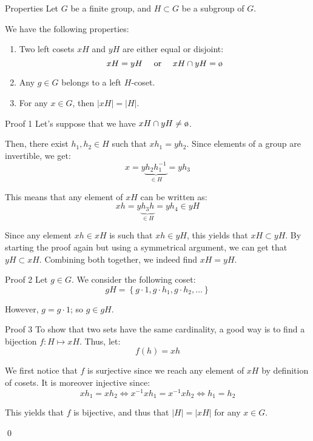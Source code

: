 \documentclass[a4paper]{article}
\begin{document}
\begin{parag}{Properties}
    Let $G$ be a finite group, and $H \subset G$ be a subgroup of $G$.

    We have the following properties:
    \begin{enumerate}
        \item Two left cosets $xH$ and $yH$ are either equal or disjoint: 
        \[x H = y H \mathspace \text{ or } \mathspace xH \cap y H = \o\]
        \item Any $g \in G$ belongs to a left $H$-coset.
        \item For any $x \in G$, then $\left|x H\right| = \left|H\right|$.
    \end{enumerate}
    
    \begin{subparag}{Proof 1}
        Let's suppose that we have $x H \cap y H \neq \o$.

        Then, there exist $h_1, h_2 \in H$ such that $x h_1 = y h_2$. Since elements of a group are invertible, we get: 
        \[x = y \underbrace{h_2 h_1^{-1}}_{\in H} = y h_3\]
        
        This means that any element of $xH$ can be written as: 
        \[xh = y \underbrace{h_3 h}_{\in H} = y h_4 \in y H\]

        Since any element $xh \in xH$ is such that $xh \in yH$, this yields that $x H \subset y H$. By starting the proof again but using a symmetrical argument, we can get that $yH \subset x H$. Combining both together, we indeed find $x H = yH$.
    \end{subparag}
    
    \begin{subparag}{Proof 2}
        Let $g \in G$. We consider the following coset: 
        \[gH = \left\{g\cdot 1, g\cdot h_1, g\cdot h_2, \ldots\right\}\]
        
        However, $g = g\cdot 1$; so $g \in gH$.
    \end{subparag}
    
    \begin{subparag}{Proof 3}
        To show that two sets have the same cardinality, a good way is to find a bijection $f: H \mapsto xH$. Thus, let: 
        \[f\left(h\right) = xh\]
        
        We first notice that $f$ is surjective since we reach any element of $xH$ by definition of cosets. It is moreover injective since: 
        \[x h_1 = x h_2 \iff x^{-1} x h_1 = x^{-1} x h_2 \iff h_1 = h_2\]
        
        This yields that $f$ is bijective, and thus that $\left|H\right| = \left|xH\right|$ for any $x \in G$.

        \qed
    \end{subparag}
\end{parag}
\end{document}

